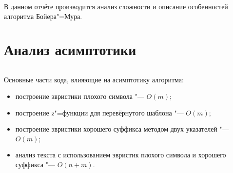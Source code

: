 \documentclass[otchet]{../SCWorks}
\begin{document}

\date{2026}

\maketitle

\secNumbering

\tableofcontents




\intro
В данном отчёте производится анализ сложности и описание особенностей алгоритма Бойера"=Мура.

\section{Анализ асимптотики}

\small
\inputminted[breaklines]{cpp}{./boyer-moore.cpp}
\normalsize

Основные части кода, влияющие на асимптотику алгоритма:

\begin{itemize}
	\item построение эвристики плохого символа "--- $O(m)$;
	\item построение z"=функции для перевёрнутого шаблона "--- $O(m)$;
	\item построение эвристики хорошего суффикса методом двух указателей "--- $O(m)$;
	\item анализ текста с использованием эвристик плохого символа и хорошего суффикса "--- $O(n + m)$.
\end{itemize}
\end{document}
